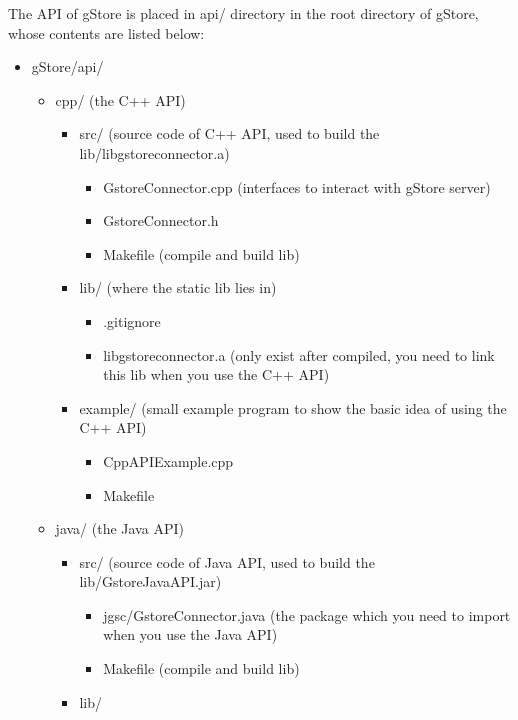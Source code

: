 \documentclass[titlepage, a4paper, 12pt]{article}
\begin{document}
The API of gStore is placed in api/ directory in the root directory of
gStore, whose contents are listed below:

\begin{itemize}
\item
  gStore/api/

  \begin{itemize}
  \item
    cpp/ (the C++ API)

    \begin{itemize}
    \item
      src/ (source code of C++ API, used to build the
      lib/libgstoreconnector.a)

      \begin{itemize}
      \item
        GstoreConnector.cpp (interfaces to interact with gStore server)
      \item
        GstoreConnector.h
      \item
        Makefile (compile and build lib)
      \end{itemize}
    \item
      lib/ (where the static lib lies in)

      \begin{itemize}
      \item
        .gitignore
      \item
        libgstoreconnector.a (only exist after compiled, you need to
        link this lib when you use the C++ API)
      \end{itemize}
    \item
      example/ (small example program to show the basic idea of using
      the C++ API)

      \begin{itemize}
      \item
        CppAPIExample.cpp
      \item
        Makefile
      \end{itemize}
    \end{itemize}
  \item
    java/ (the Java API)

    \begin{itemize}
    \item
      src/ (source code of Java API, used to build the
      lib/GstoreJavaAPI.jar)

      \begin{itemize}
      \item
        jgsc/GstoreConnector.java (the package which you need to import when you use the Java API)
      \item
        Makefile (compile and build lib)
      \end{itemize}
    \item
      lib/


\end{itemize}
\end{itemize}
\end{itemize}
\end{document}
